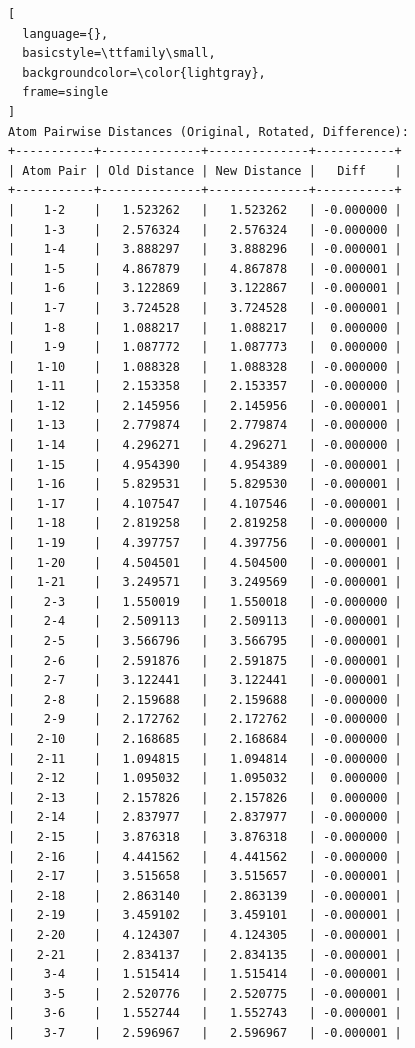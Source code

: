 \documentclass{article}
\begin{document}
\begin{lstlisting}[
  language={},
  basicstyle=\ttfamily\small,
  backgroundcolor=\color{lightgray},
  frame=single
]
Atom Pairwise Distances (Original, Rotated, Difference):
+-----------+--------------+--------------+-----------+
| Atom Pair | Old Distance | New Distance |   Diff    |
+-----------+--------------+--------------+-----------+
|    1-2    |   1.523262   |   1.523262   | -0.000000 |
|    1-3    |   2.576324   |   2.576324   | -0.000000 |
|    1-4    |   3.888297   |   3.888296   | -0.000001 |
|    1-5    |   4.867879   |   4.867878   | -0.000001 |
|    1-6    |   3.122869   |   3.122867   | -0.000001 |
|    1-7    |   3.724528   |   3.724528   | -0.000001 |
|    1-8    |   1.088217   |   1.088217   |  0.000000 |
|    1-9    |   1.087772   |   1.087773   |  0.000000 |
|   1-10    |   1.088328   |   1.088328   | -0.000000 |
|   1-11    |   2.153358   |   2.153357   | -0.000000 |
|   1-12    |   2.145956   |   2.145956   | -0.000001 |
|   1-13    |   2.779874   |   2.779874   | -0.000000 |
|   1-14    |   4.296271   |   4.296271   | -0.000000 |
|   1-15    |   4.954390   |   4.954389   | -0.000001 |
|   1-16    |   5.829531   |   5.829530   | -0.000001 |
|   1-17    |   4.107547   |   4.107546   | -0.000001 |
|   1-18    |   2.819258   |   2.819258   | -0.000000 |
|   1-19    |   4.397757   |   4.397756   | -0.000001 |
|   1-20    |   4.504501   |   4.504500   | -0.000001 |
|   1-21    |   3.249571   |   3.249569   | -0.000001 |
|    2-3    |   1.550019   |   1.550018   | -0.000000 |
|    2-4    |   2.509113   |   2.509113   | -0.000001 |
|    2-5    |   3.566796   |   3.566795   | -0.000001 |
|    2-6    |   2.591876   |   2.591875   | -0.000001 |
|    2-7    |   3.122441   |   3.122441   | -0.000001 |
|    2-8    |   2.159688   |   2.159688   | -0.000000 |
|    2-9    |   2.172762   |   2.172762   | -0.000000 |
|   2-10    |   2.168685   |   2.168684   | -0.000000 |
|   2-11    |   1.094815   |   1.094814   | -0.000000 |
|   2-12    |   1.095032   |   1.095032   |  0.000000 |
|   2-13    |   2.157826   |   2.157826   |  0.000000 |
|   2-14    |   2.837977   |   2.837977   | -0.000000 |
|   2-15    |   3.876318   |   3.876318   | -0.000000 |
|   2-16    |   4.441562   |   4.441562   | -0.000000 |
|   2-17    |   3.515658   |   3.515657   | -0.000001 |
|   2-18    |   2.863140   |   2.863139   | -0.000001 |
|   2-19    |   3.459102   |   3.459101   | -0.000001 |
|   2-20    |   4.124307   |   4.124305   | -0.000001 |
|   2-21    |   2.834137   |   2.834135   | -0.000001 |
|    3-4    |   1.515414   |   1.515414   | -0.000001 |
|    3-5    |   2.520776   |   2.520775   | -0.000001 |
|    3-6    |   1.552744   |   1.552743   | -0.000001 |
|    3-7    |   2.596967   |   2.596967   | -0.000001 |

\end{lstlisting}
\end{document}
